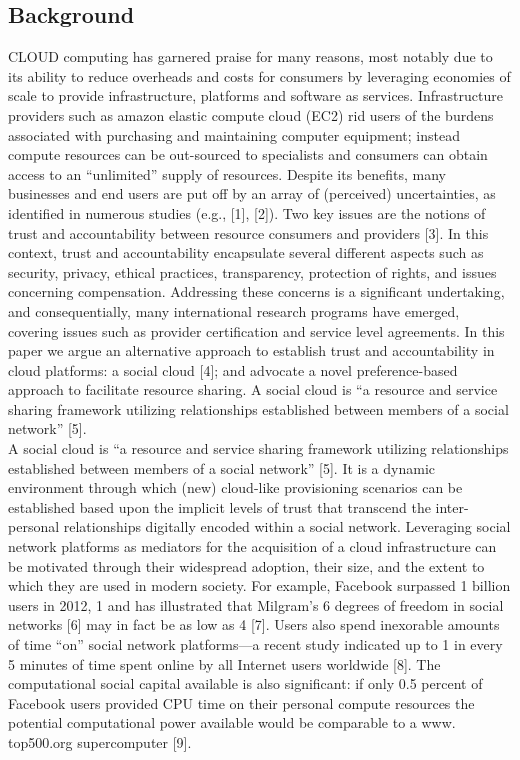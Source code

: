 \documentclass[a4paper,12pt]{article}
\begin{document}
	\subsection{Background}
            CLOUD computing has garnered praise for many reasons, most notably due to its ability to reduce overheads and costs for consumers by leveraging economies of scale to provide infrastructure, platforms and software as services. Infrastructure providers such as amazon elastic compute cloud (EC2) rid users of the burdens associated with purchasing and maintaining computer equipment; instead compute resources can be out-sourced to specialists and consumers can obtain access to an “unlimited” supply of resources. Despite its benefits, many businesses and end users are put off by an array of (perceived) uncertainties, as identified in numerous studies (e.g., [1], [2]). Two key issues are the notions of trust and accountability between resource consumers and providers [3]. In this context, trust and accountability encapsulate several different aspects such as security, privacy, ethical practices, transparency, protection of rights, and issues concerning compensation. Addressing these concerns is a significant undertaking, and consequentially, many international research programs have emerged, covering issues such as provider certification and service level agreements. In this paper we argue an alternative approach to establish trust and accountability in cloud platforms: a social cloud [4]; and advocate a novel preference-based approach to facilitate resource sharing. A social cloud is “a resource and service sharing framework utilizing relationships established between members of a social network” [5]. \\
A social cloud is “a resource and service sharing framework utilizing relationships established between members of a social network” [5]. It is a dynamic environment through which (new) cloud-like provisioning scenarios can be established based upon the implicit levels of trust that transcend the inter-personal relationships digitally encoded within a social network. Leveraging social network platforms as mediators for the acquisition of a cloud infrastructure can be motivated through their widespread adoption, their size, and the extent to which they are used in modern society. For example, Facebook surpassed 1 billion users in 2012, 1 and has illustrated that Milgram’s 6 degrees of freedom in social networks [6] may in fact be as low as 4 [7]. Users also spend inexorable amounts of time “on” social network platforms—a recent study indicated up to 1 in every 5 minutes of time spent online by all Internet users worldwide [8]. The computational social capital available is also significant: if only 0.5 percent of Facebook users provided CPU time on their personal compute resources the potential computational power available would be comparable to a www. top500.org supercomputer [9].
\end{document}
